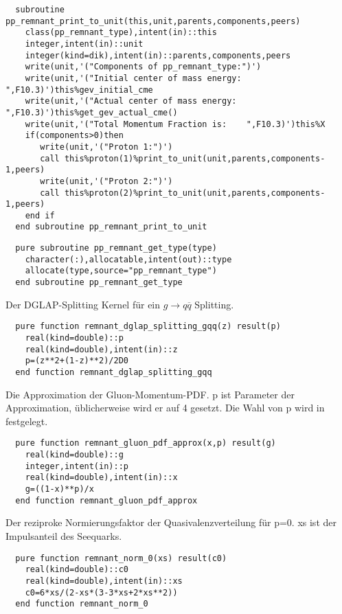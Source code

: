 \begin{Verbatim}
  subroutine pp_remnant_print_to_unit(this,unit,parents,components,peers)
    class(pp_remnant_type),intent(in)::this
    integer,intent(in)::unit
    integer(kind=dik),intent(in)::parents,components,peers
    write(unit,'("Components of pp_remnant_type:")')
    write(unit,'("Initial center of mass energy: ",F10.3)')this%gev_initial_cme
    write(unit,'("Actual center of mass energy:  ",F10.3)')this%get_gev_actual_cme()
    write(unit,'("Total Momentum Fraction is:    ",F10.3)')this%X
    if(components>0)then
       write(unit,'("Proton 1:")')
       call this%proton(1)%print_to_unit(unit,parents,components-1,peers)
       write(unit,'("Proton 2:")')
       call this%proton(2)%print_to_unit(unit,parents,components-1,peers)
    end if
  end subroutine pp_remnant_print_to_unit
\end{Verbatim}
\begin{Verbatim}
  pure subroutine pp_remnant_get_type(type)
    character(:),allocatable,intent(out)::type
    allocate(type,source="pp_remnant_type")
  end subroutine pp_remnant_get_type
\end{Verbatim}
\MethodsNTB
{}
Der DGLAP-Splitting Kernel für ein $g\rightarrow q \overline{q}$ Splitting.
\begin{Verbatim}
  pure function remnant_dglap_splitting_gqq(z) result(p)
    real(kind=double)::p
    real(kind=double),intent(in)::z
    p=(z**2+(1-z)**2)/2D0
  end function remnant_dglap_splitting_gqq
\end{Verbatim}  
Die Approximation der Gluon-Momentum-PDF. p ist Parameter der Approximation, üblicherweise wird er auf 4 gesetzt. Die Wahl von p wird in  festgelegt.
\begin{Verbatim}
  pure function remnant_gluon_pdf_approx(x,p) result(g)
    real(kind=double)::g
    integer,intent(in)::p
    real(kind=double),intent(in)::x
    g=((1-x)**p)/x
  end function remnant_gluon_pdf_approx
\end{Verbatim}

Der reziproke Normierungsfaktor der Quasivalenzverteilung für p=0. xs ist der Impulsanteil des Seequarks.
\begin{Verbatim}
  pure function remnant_norm_0(xs) result(c0)
    real(kind=double)::c0
    real(kind=double),intent(in)::xs
    c0=6*xs/(2-xs*(3-3*xs+2*xs**2))
  end function remnant_norm_0
\end{Verbatim}

